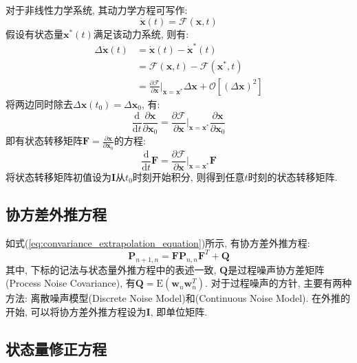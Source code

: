 \documentclass[12pt]{article}
\begin{document}
对于非线性力学系统, 其动力学方程可写作:
\begin{equation}
\dot{\bm{x}}(t) = \bm{\mathcal{F}}(\bm{x}, t) 
\end{equation}
假设有状态量$\bm{x}^*(t)$满足该动力系统, 则有:
\begin{equation*}
\begin{aligned}
\Delta \dot{\bm{x}}(t) &= \dot{\bm{x}}(t) - \dot{\bm{x}}^*(t) \\
					   &= \bm{\mathcal{F}}(\bm{x}, t) - \bm{\mathcal{F}}(\bm{x}^*, t) \\
					   &= \frac{\partial{\bm{\mathcal{F}}}}{\partial{\bm{x}}} |_{\bm{x} = \bm{x}^*} \Delta \bm{x} + \mathcal{O} [(\Delta \bm{x})^2]
\end{aligned}
\end{equation*}
将两边同时除去$\Delta \bm{x}(t_0) = \Delta \bm{x}_0$, 有:
\begin{equation} 
\frac{\mathrm{d}}{\mathrm{d}t} \frac{\partial \bm{x}}{\partial \bm{x}_0} = \frac{\partial \bm{\mathcal{F}}}{\partial \bm{x}} |_{\bm{x} = \bm{x}^*} \frac{\partial \bm{x}}{\partial \bm{x}_0}
\end{equation}
即有状态转移矩阵$\bm{F} = \frac{\partial \bm{x}}{\partial \bm{x}_0}$的方程:
\begin{equation} \label{eq:stm_nonlinear}
\frac{\mathrm{d}}{\mathrm{d}t} \bm{F} = \frac{\partial \bm{\mathcal{F}}}{\partial \bm{x}} |_{\bm{x} = \bm{x}^*} \bm{F}
\end{equation}
将状态转移矩阵初值设为$\bm{I}$从$t_0$时刻开始积分, 则得到任意$t$时刻的状态转移矩阵.

\subsection{协方差外推方程}

如式(\ref{eq:convariance_extrapolation_equation})所示, 有协方差外推方程:
\begin{equation*}
\bm{P}_{n+1,n} = \bm{F}\bm{P}_{n,n}\bm{F}^T + \bm{Q}
\end{equation*}
其中, 下标的记法与状态量外推方程中的表述一致, $\bm{Q}$是过程噪声协方差矩阵(Process Noise Covariance), 有$\bm{Q} = \mathrm{E}(\bm{w}_n \bm{w}_n^T)$. 对于过程噪声的方针, 主要有两种方法: 离散噪声模型(Discrete Noise Model)和(Continuous Noise Model). 在外推的开始, 可以将协方差外推方程设为$\bm{I}$, 即单位矩阵. 

\subsection{状态量修正方程}
\end{document}

